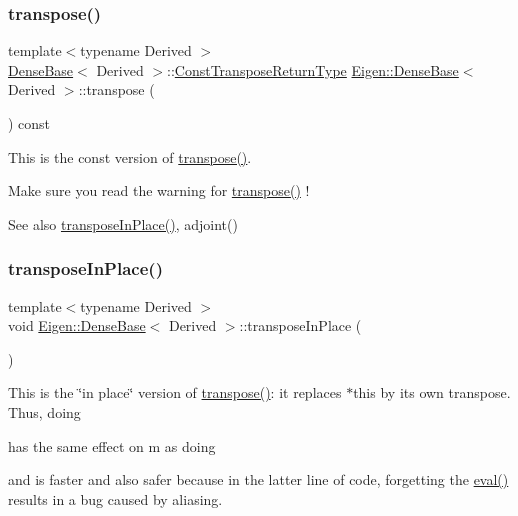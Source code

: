 \subsubsection{\texorpdfstring{transpose()}{transpose()}\hspace{0.1cm}{\footnotesize\ttfamily [2/2]}}
{\footnotesize\ttfamily template$<$typename Derived $>$ \\
\mbox{\hyperlink{class_eigen_1_1_dense_base}{Dense\+Base}}$<$ Derived $>$\+::\mbox{\hyperlink{class_eigen_1_1_transpose}{Const\+Transpose\+Return\+Type}} \mbox{\hyperlink{class_eigen_1_1_dense_base}{Eigen\+::\+Dense\+Base}}$<$ Derived $>$\+::transpose (\begin{DoxyParamCaption}{ }\end{DoxyParamCaption}) const\hspace{0.3cm}{\ttfamily [inline]}}

This is the const version of \mbox{\hyperlink{class_eigen_1_1_dense_base_ac8952c19644a4ac7e41bea45c19b909c}{transpose()}}.

Make sure you read the warning for \mbox{\hyperlink{class_eigen_1_1_dense_base_ac8952c19644a4ac7e41bea45c19b909c}{transpose()}} !

\begin{DoxySeeAlso}{See also}
\mbox{\hyperlink{class_eigen_1_1_dense_base_ac501bd942994af7a95d95bee7a16ad2a}{transpose\+In\+Place()}}, adjoint() 
\end{DoxySeeAlso}
\mbox{\label{class_eigen_1_1_dense_base_ac501bd942994af7a95d95bee7a16ad2a}} 
\subsubsection{\texorpdfstring{transposeInPlace()}{transposeInPlace()}}
{\footnotesize\ttfamily template$<$typename Derived $>$ \\
void \mbox{\hyperlink{class_eigen_1_1_dense_base}{Eigen\+::\+Dense\+Base}}$<$ Derived $>$\+::transpose\+In\+Place (\begin{DoxyParamCaption}{ }\end{DoxyParamCaption})\hspace{0.3cm}{\ttfamily [inline]}}

This is the \char`\"{}in place\char`\"{} version of \mbox{\hyperlink{class_eigen_1_1_dense_base_ac8952c19644a4ac7e41bea45c19b909c}{transpose()}}\+: it replaces {\ttfamily $\ast$this} by its own transpose. Thus, doing 
\begin{DoxyCode}{0}
\end{DoxyCode}
 has the same effect on m as doing 
\begin{DoxyCode}{0}
\end{DoxyCode}
 and is faster and also safer because in the latter line of code, forgetting the \mbox{\hyperlink{class_eigen_1_1_dense_base_a5df64c66228ba75bbc66db2584185527}{eval()}} results in a bug caused by aliasing.

